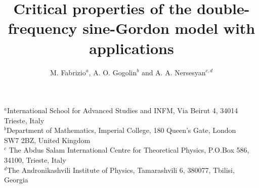 





\setlength {\textwidth}{14.5cm}
\setlength {\textheight}{23cm}
\setlength {\oddsidemargin}{11mm}
\setlength {\topmargin}{-15mm}   
\setlength {\headheight}{8mm}
\setlength {\headsep}{10mm}
\newcommand{\be}{\begin{equation}}
\newcommand{\ee}{\end{equation}}
\newcommand{\bea}{\begin{eqnarray}}
\newcommand{\eea}{\end{eqnarray}}
\newcommand{\bn}{\begin{eqnarray*}}
\newcommand{\en}{\end{eqnarray*}}
\newcommand{\pdag}{{\phantom{\dagger}}}
\newcommand{\rD}{\mbox{D}}
\newcommand{\reff}{\mbox{eff}}
\newcommand{\rR}{\mbox{R}}
\newcommand{\rL}{\mbox{L}}
\newcommand{\p}{\partial}
\newcommand{\s}{\sigma}
\newcommand{\rF}{\mbox{F}}
\newcommand{\rf}{\mbox{f}}
\newcommand{\up}{\uparrow}
\newcommand{\down}{\downarrow}
\newcommand{\la}{\langle}
\newcommand{\ra}{\rangle}
\newcommand{\rd}{\mbox{d}}
\newcommand{\ri}{\mbox{i}}
\newcommand{\re}{\mbox{e}}
\newcommand{\sumnn}{\sum_{\langle jk \rangle}}
\newcommand{\rk}{\mbox{k}}
\newcommand{\htau}{\hat{\tau}}
\newcommand{\var}{\varepsilon}
\renewcommand{\baselinestretch}{1.26}
%
%

\title{Critical properties of the double-frequency sine-Gordon model 
with applications}
\author{M. Fabrizio$^a$, A. O. Gogolin$^b$ and A. A. Nersesyan$^{c,d}$}
\vspace{2cm}
\maketitle

\begin {center}
$^a$International School for Advanced Studies and INFM, 
Via Beirut 4, 34014 Trieste, Italy\\ 
$^b$Department of Mathematics, Imperial College, 180 Queen's Gate,
London\\ 
SW7 2BZ, United Kingdom\\
$^c$ The Abdus Salam International Centre for Theoretical Physics,
P.O.Box 586, 34100, Trieste, Italy\\
$^d$The Andronikashvili Institute of Physics, Tamarashvili 6, 380077, 
Tbilisi, Georgia
\end{center}

